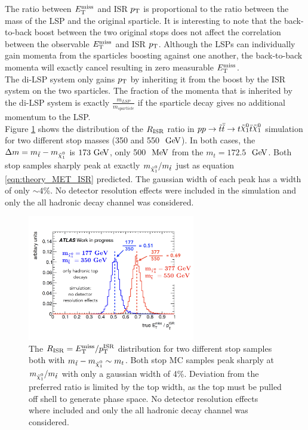 \indent The ratio between $E_{\mathrm{T}}^{\mathrm{miss}}$ and ISR $p_{\mathrm{T}}$ is proportional to the ratio between the mass of the LSP and the original sparticle.  It is interesting to note that the back-to-back boost between the two original stops does not affect the correlation between the observable $E_{\mathrm{T}}^{\mathrm{miss}}$ and ISR $p_{\mathrm{T}}$.  Although the LSPs can individually gain momenta from the sparticles boosting against one another, the back-to-back momenta will exactly cancel resulting in zero measurable $E_{\mathrm{T}}^{\mathrm{miss}}$.  \\

\indent The di-LSP system only gains $p_{\mathrm{T}}$ by inheriting it from the boost by the ISR system on the two sparticles.  The fraction of the momenta that is inherited by the di-LSP system is exactly $\frac{m_{LSP}}{m_{sparticle}}$ if the sparticle decay gives no additional momentum to the LSP.  \\

\indent Figure \ref{fig:stop_400_227_ISR_MET_truth} shows the distribution of the $R_{\mathrm{ISR}}$ ratio in $p p \rightarrow \antibar{\stop} \rightarrow t\ninoone\tbar\ninoone$ simulation for two different stop masses (350 and 550 $\gev$).   In both cases, the $\Delta m = m_{\stop} - m_{\ninoone}$ is $173 \gev$, only 500 $\mev$ from the $m_t = 172.5$ $\gev$.  Both stop samples sharply peak at exactly $m_{\ninoone}/m_{\stop}$ just as equation \ref{eqn:theory_MET_ISR} predicted.  The gaussian width of each peak has a width of only $\sim4$\%.  No detector resolution effects were included in the simulation and only the all hadronic decay channel was considered. \\

\begin{figure}[h!]
  \centering
	\includegraphics[width=0.65\textwidth]{./figures/strategy/RISR_truth.png}
\caption[$\RISR = \met/\PTISR$ distributions for stop signals with $m_{\stop} - m_{\ninoone} \sim m_t$ in MC simulation]{The $\RISR = \met/\PTISR $ distribution for two different stop samples both with $m_{\stop} - m_{\ninoone} \sim m_t$.  Both stop MC samples peak sharply at $m_{\ninoone}/m_{\stop}$ with only a gaussian width of 4\%.  Deviation from the preferred ratio is limited by the top width, as the top must be pulled off shell to generate phase space. No detector resolution effects where included and only the all hadronic decay channel was considered.}
\label{fig:stop_400_227_ISR_MET_truth}
\end{figure}

